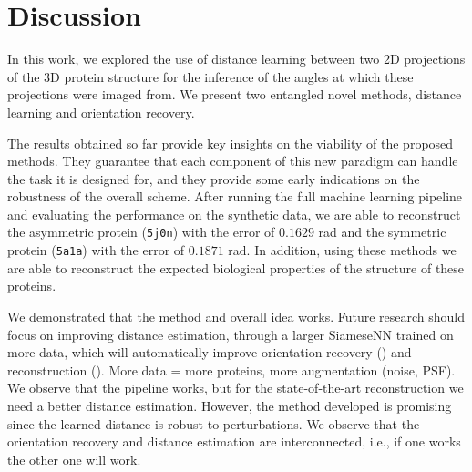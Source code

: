 \section{Discussion}



 In this work, we explored the use of distance learning between two 2D projections of the 3D protein structure for the inference of the angles at which these projections were imaged from.
We present two entangled novel methods, distance learning and orientation recovery.

The results obtained so far provide key insights on the viability of the proposed methods.
They guarantee that each component of this new paradigm can handle the task it is designed for, and they provide some early indications on the robustness of the overall scheme.
After running the full machine learning pipeline and evaluating the performance on the synthetic data, we are able to reconstruct the asymmetric protein (\texttt{5j0n}) with the error of $0.1629$ rad and the symmetric protein (\texttt{5a1a}) with the error of $0.1871$ rad.
In addition, using these methods we are able to reconstruct the expected biological properties of the structure of these proteins.

We demonstrated that the method and overall idea works. Future research should focus on improving distance estimation, through a larger SiameseNN trained on more data, which will automatically improve orientation recovery () and reconstruction ().
More data = more proteins, more augmentation (noise, PSF).
We observe that the pipeline works, but for the state-of-the-art reconstruction we need a better distance estimation.
However, the method developed is promising since the learned distance is robust to perturbations.
We observe that the orientation recovery and distance estimation are interconnected, i.e., if one works the other one will work.

